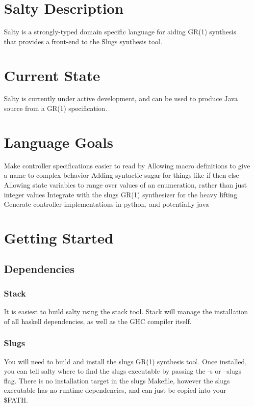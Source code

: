 
\section{Salty Description}

Salty is a strongly-typed domain specific language for aiding GR(1) synthesis that provides a front-end to the Slugs synthesis tool. 

\section{Current State}

Salty is currently under active development, and can be used to produce Java source from a GR(1) specification.

\section{Language Goals}

Make controller specifications easier to read by
Allowing macro definitions to give a name to complex behavior
Adding syntactic-sugar for things like if-then-else
Allowing state variables to range over values of an enumeration, rather than just integer values
Integrate with the slugs GR(1) synthesizer for the heavy lifting
Generate controller implementations in python, and potentially java

\section{Getting Started}

\subsection{Dependencies}

\subsubsection{Stack}

It is easiest to build salty using the stack tool. Stack will manage the installation of all haskell dependencies, as well as the GHC compiler itself. 

\subsubsection{Slugs}

You will need to build and install the slugs GR(1) synthesis tool. Once installed, you can tell salty where to find the slugs executable by passing the -s or --slugs flag. There is no installation target in the slugs Makefile, however the slugs executable has no runtime dependencies, and can just be copied into your \$PATH.

